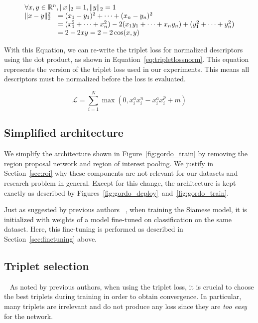 \begin{equation}\label{eq:sqdistcosdot}
\begin{array}{ll}
\multicolumn{2}{l}{\forall x, y \in \mathbb{R}^n, \|x\|_2 = 1, \|y\|_2 = 1}\\
\|x-y\|_2^2 &= (x_1-y_1)^2 + \dots + (x_n-y_n)^2\\
&=(x_1^2 + \dots + x_n^2) - 2(x_1y_1 + \dots + x_ny_n) +
(y_1^2 + \dots + y_n^2)\\
&=2 - 2xy = 2 - 2\cos(x, y)
\end{array}
\end{equation}

With this Equation, we can re-write the triplet loss for normalized descriptors
using the dot product, as shown in Equation~\ref{eq:tripletlossnorm}.
This equation represents the version of the triplet loss used in
our experiments. This means all descriptors must be normalized before
the loss is evaluated.

\begin{equation}\label{eq:tripletlossnorm}
\mathcal{L} = \sum_{i=1}^N
\max(0, x^a_i x^n_i - x^a_i x^p_i + m)
\end{equation}

\subsection{Simplified architecture}
We simplify the architecture shown in Figure~\ref{fig:gordo_train}
by removing the region proposal network and region of interest pooling.
We justify in Section~\ref{sec:roi} why these components are not
relevant for our datasets and research problem in general.
Except for this change, the architecture is kept exactly as described
by Figures~\ref{fig:gordo_deploy}~and~\ref{fig:gordo_train}.

Just as suggested by previous authors
~\cite{gordo_deep_2016,schroff_facenet:_2015}, when training the Siamese
model, it is initialized with weights of a model fine-tuned on classification
on the same dataset. Here, this fine-tuning is performed as described in
Section~\ref{sec:finetuning} above.

\subsection{Triplet selection}~\label{sec:tripletselection}
As noted by previous authors, when using the triplet loss, it is
crucial to choose the best triplets during training in order to
obtain convergence. In particular, many triplets are irrelevant
and do not produce any loss since they are \emph{too easy} for the network.

